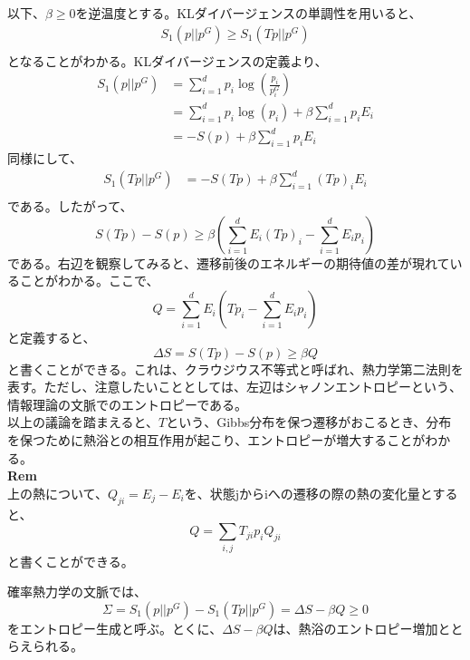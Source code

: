 \documentclass[a4paper,11pt]{jsarticle}
\numberwithin{equation}{section}
\begin{document}
以下、$\beta \geq 0$を逆温度とする。KLダイバージェンスの単調性を用いると、
\begin{align}
    S_1(p||p^G) \geq S_1(Tp||p^G)\\
\end{align}
となることがわかる。KLダイバージェンスの定義より、
\begin{align}
    S_1(p||p^G) &= \sum_{i=1}^{d}p_i\log\left(\frac{p_i}{p_i^G}\right)\\
    &= \sum_{i=1}^{d}p_i\log(p_i) + \beta \sum_{i=1}^{d}p_i E_i\\
    &= -S(p) + \beta \sum_{i=1}^{d}p_i E_i
\end{align}
同様にして、
\begin{align}
    S_1(Tp||p^G) &= -S(Tp) + \beta \sum_{i=1}^{d}(Tp)_i E_i\\
\end{align}
である。したがって、
\begin{equation}
    S(Tp) - S(p) \geq \beta (\sum_{i=1}^{d}E_i(Tp)_i - \sum_{i=1}^{d}E_ip_i)
\end{equation}
である。右辺を観察してみると、遷移前後のエネルギーの期待値の差が現れていることがわかる。ここで、
\begin{equation}
    Q = \sum_{i=1}^{d}E_i(Tp_i - \sum_{i=1}^{d}E_ip_i)
\end{equation}
と定義すると、
\begin{equation}
    \Delta S =S(Tp) - S(p) \geq \beta Q
\end{equation}
と書くことができる。これは、クラウジウス不等式と呼ばれ、熱力学第二法則を表す。ただし、注意したいこととしては、左辺はシャノンエントロピーという、情報理論の文脈でのエントロピーである。\\
以上の議論を踏まえると、$T$という、Gibbs分布を保つ遷移がおこるとき、分布を保つために熱浴との相互作用が起こり、エントロピーが増大することがわかる。\\
\textbf{Rem}\\
上の熱について、$Q_{ji} =E_j-E_i$を、状態jからiへの遷移の際の熱の変化量とすると、
\begin{equation}
    Q = \sum_{i,j}T_{ji}p_iQ_{ji}
\end{equation}
と書くことができる。%

確率熱力学の文脈では、
\begin{equation}
    \Sigma = S_1(p||p^G)-S_1(Tp||p^G)=\Delta S - \beta Q \geq 0
\end{equation}
をエントロピー生成と呼ぶ。とくに、$\Delta S-\beta Q$は、熱浴のエントロピー増加ととらえられる。\\
\end{document}
